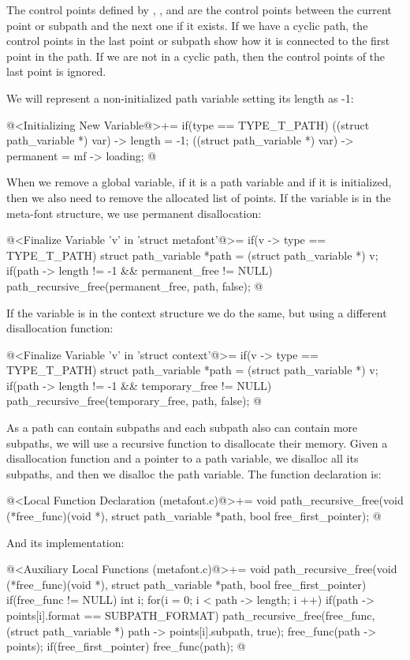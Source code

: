 The control points defined
by , , 
and  are the control points between the current point
or subpath and the next one if it exists. If we have a cyclic path,
the control points in the last point or subpath show how it is
connected to the first point in the path. If we are not in a cyclic
path, then the control points of the last point is ignored.

We will represent a non-initialized path variable setting its length
as -1:

\iniciocodigo
@<Initializing New Variable@>+=
if(type == TYPE_T_PATH){
  ((struct path_variable *) var) -> length = -1;
  ((struct path_variable *) var) -> permanent = mf -> loading;
}
@
\fimcodigo

When we remove a global variable, if it is a path variable and if it
is initialized, then we also need to remove the allocated list of
points. If the variable is in the meta-font structure, we use
permanent disallocation:

\iniciocodigo
@<Finalize Variable 'v' in 'struct metafont'@>=
if(v -> type == TYPE_T_PATH){
  struct path_variable *path = (struct path_variable *) v;  
  if(path -> length != -1 && permanent_free != NULL)
    path_recursive_free(permanent_free, path, false);
}
@
\fimcodigo

If the variable is in the context structure we do the same, but using
a different disallocation function:

\iniciocodigo
@<Finalize Variable 'v' in 'struct context'@>=
if(v -> type == TYPE_T_PATH){
  struct path_variable *path = (struct path_variable *) v;
  if(path -> length != -1 && temporary_free != NULL)
    path_recursive_free(temporary_free, path, false);
}
@
\fimcodigo

As a path can contain subpaths and each subpath also can contain more
subpaths, we will use a recursive function to disallocate their
memory. Given a disallocation function and a pointer to a path
variable, we disalloc all its subpaths, and then we disalloc the path
variable. The function declaration is:

\iniciocodigo
@<Local Function Declaration (metafont.c)@>+=
void path_recursive_free(void (*free_func)(void *),
                         struct path_variable *path,
                         bool free_first_pointer);
@
\fimcodigo

And its implementation:

\iniciocodigo
@<Auxiliary Local Functions (metafont.c)@>+=
void path_recursive_free(void (*free_func)(void *),
                         struct path_variable *path,
                         bool free_first_pointer){
  if(free_func != NULL){
    int i;
    for(i = 0; i < path -> length; i ++){
      if(path -> points[i].format == SUBPATH_FORMAT)
        path_recursive_free(free_func, (struct path_variable *)
                                       path -> points[i].subpath, true);
    }
    free_func(path -> points);
    if(free_first_pointer)
      free_func(path);
  }
}
@
\fimcodigo

